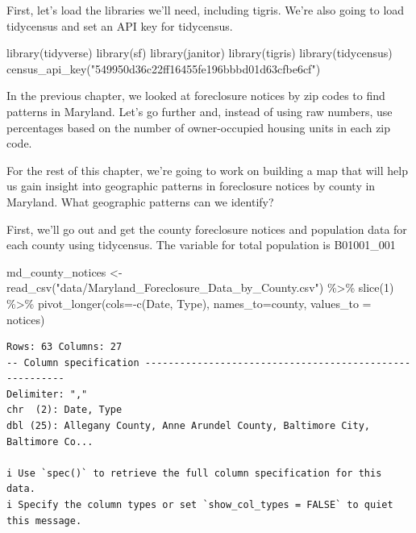 \documentclass[
  letterpaper,
  DIV=11,
  numbers=noendperiod]{scrreprt}
\newenvironment{Shaded}{\begin{snugshade}}{\end{snugshade}}
\newcommand{\AttributeTok}[1]{\textcolor[rgb]{0.40,0.45,0.13}{#1}}
\newcommand{\DecValTok}[1]{\textcolor[rgb]{0.68,0.00,0.00}{#1}}
\newcommand{\FunctionTok}[1]{\textcolor[rgb]{0.28,0.35,0.67}{#1}}
\newcommand{\NormalTok}[1]{\textcolor[rgb]{0.00,0.23,0.31}{#1}}
\newcommand{\OtherTok}[1]{\textcolor[rgb]{0.00,0.23,0.31}{#1}}
\newcommand{\SpecialCharTok}[1]{\textcolor[rgb]{0.37,0.37,0.37}{#1}}
\newcommand{\StringTok}[1]{\textcolor[rgb]{0.13,0.47,0.30}{#1}}
\begin{document}
First, let's load the libraries we'll need, including tigris. We're also
going to load tidycensus and set an API key for tidycensus.

\begin{Shaded}
\begin{Highlighting}[]
\FunctionTok{library}\NormalTok{(tidyverse)}
\FunctionTok{library}\NormalTok{(sf)}
\FunctionTok{library}\NormalTok{(janitor)}
\FunctionTok{library}\NormalTok{(tigris)}
\FunctionTok{library}\NormalTok{(tidycensus)}
\FunctionTok{census\_api\_key}\NormalTok{(}\StringTok{"549950d36c22ff16455fe196bbbd01d63cfbe6cf"}\NormalTok{)}
\end{Highlighting}
\end{Shaded}

In the previous chapter, we looked at foreclosure notices by zip codes
to find patterns in Maryland. Let's go further and, instead of using raw
numbers, use percentages based on the number of owner-occupied housing
units in each zip code.

For the rest of this chapter, we're going to work on building a map that
will help us gain insight into geographic patterns in foreclosure
notices by county in Maryland. What geographic patterns can we identify?

First, we'll go out and get the county foreclosure notices and
population data for each county using tidycensus. The variable for total
population is B01001\_001

\begin{Shaded}
\begin{Highlighting}[]
\NormalTok{md\_county\_notices }\OtherTok{\textless{}{-}} \FunctionTok{read\_csv}\NormalTok{(}\StringTok{"data/Maryland\_Foreclosure\_Data\_by\_County.csv"}\NormalTok{) }\SpecialCharTok{\%\textgreater{}\%} \FunctionTok{slice}\NormalTok{(}\DecValTok{1}\NormalTok{) }\SpecialCharTok{\%\textgreater{}\%} \FunctionTok{pivot\_longer}\NormalTok{(}\AttributeTok{cols=}\SpecialCharTok{{-}}\FunctionTok{c}\NormalTok{(}\StringTok{\textquotesingle{}Date\textquotesingle{}}\NormalTok{, }\StringTok{\textquotesingle{}Type\textquotesingle{}}\NormalTok{), }\AttributeTok{names\_to=}\StringTok{\textquotesingle{}county\textquotesingle{}}\NormalTok{, }\AttributeTok{values\_to =} \StringTok{\textquotesingle{}notices\textquotesingle{}}\NormalTok{)}
\end{Highlighting}
\end{Shaded}

\begin{verbatim}
Rows: 63 Columns: 27
-- Column specification --------------------------------------------------------
Delimiter: ","
chr  (2): Date, Type
dbl (25): Allegany County, Anne Arundel County, Baltimore City, Baltimore Co...

i Use `spec()` to retrieve the full column specification for this data.
i Specify the column types or set `show_col_types = FALSE` to quiet this message.
\end{verbatim}
\end{document}
